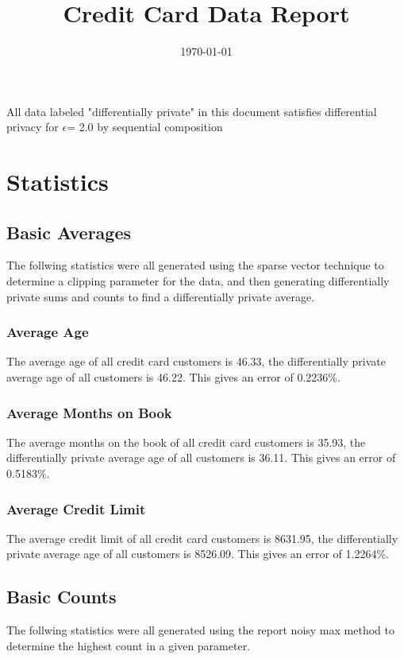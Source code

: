 \documentclass{article}%
\title{Credit Card Data Report}%
\date{\today}%
\begin{document}
%
\normalsize%
\maketitle%
All data labeled "differentially private" in this document satisfies differential privacy for %
$\epsilon$=%
2.0 by sequential composition%
\section{Statistics}%
\label{sec:Statistics}%
\subsection{Basic Averages}%
\label{subsec:BasicAverages}%
The follwing statistics were all generated using the sparse vector technique to determine a clipping parameter for the data, and then generating differentially private sums and counts to find a differentially private average.%
\subsubsection{Average Age}%
\label{ssubsec:AverageAge}%
The average age of all credit card customers is 46.33, the differentially private average age of all customers is 46.22. This gives an error of 0.2236\%.

%
\subsubsection{Average Months on Book}%
\label{ssubsec:AverageMonthsonBook}%
The average months on the book of all credit card customers is 35.93, the differentially private average age of all customers is 36.11. This gives an error of 0.5183\%.

%
\subsubsection{Average Credit Limit}%
\label{ssubsec:AverageCreditLimit}%
The average credit limit of all credit card customers is 8631.95, the differentially private average age of all customers is 8526.09. This gives an error of 1.2264\%.

%
\subsection{Basic Counts}%
\label{subsec:BasicCounts}%
The follwing statistics were all generated using the report noisy max method to determine the highest count in a given parameter.%
\end{document}

